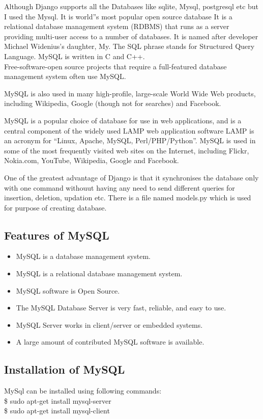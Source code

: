 Although Django supports all the Databases like sqlite, Mysql, postgresql etc 
but I used the Mysql. It is world''s most popular open source database It 
is a relational database management system (RDBMS) that runs as a server 
providing multi-user access to a number of databases. It is named after 
developer Michael Widenius's daughter, My. The SQL phrase stands for
Structured Query Language. MySQL is written in C and C++.\\
         Free-software-open source projects that require a 
full-featured database management system
often use MySQL.

MySQL is also used in many high-profile, large-scale World 
Wide Web products, including
Wikipedia, Google (though not for searches) and Facebook.

MySQL is a popular choice of database for use in web 
applications, and is a central component of the widely used LAMP web 
application software LAMP is an acronym for “Linux, Apache, MySQL, 
Perl/PHP/Python”.
         MySQL is used in some of the most frequently visited web sites 
on the Internet, including Flickr, Nokia.com, YouTube, Wikipedia, Google 
and Facebook.

One of the greatest advantage of Django is that it synchronises the 
database only with one command withouut having any need to send 
different queries for insertion, deletion, updation etc. There is a 
file named models.py which is used for purpose of creating database.
\subsection{Features of MySQL}
\begin{itemize}
\item MySQL is a database management system.
\item MySQL is a relational database management system.
\item MySQL software is Open Source.
\item The MySQL Database Server is very fast, reliable, and easy to 
use.
\item MySQL Server works in client/server or embedded systems.
\item A large amount of contributed MySQL software is available.
\end{itemize}
\subsection{Installation of MySQL}
MySql can be installed using following commands:\\

\hspace{4pt} \$ sudo apt-get install mysql-server\\

\hspace{4pt} \$ sudo apt-get install mysql-client

